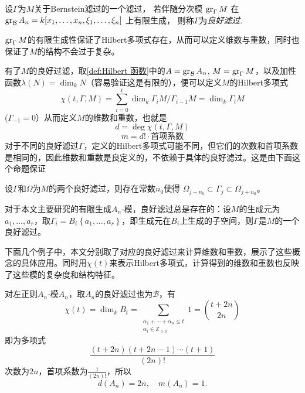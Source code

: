 \documentclass[12pt,a4paper]{ctexrep}   %
\begin{document}
\begin{definition}
    设$\Gamma$为$M$关于Bernstein滤过的一个滤过，
    若伴随分次模 $\operatorname{gr}_\Gamma M$
    在 $\operatorname{gr}_{\mathcal{B}}A_n=k[x_1,\dots,x_n,\xi_1,\dots,\xi_n]$ 上有限生成，
    则称$\Gamma$为\emph{良好滤过}.
\end{definition}
$\operatorname{gr}_{\Gamma}M$的有限生成性保证了Hilbert多项式存在，从而可以定义维数与重数，同时也保证了$M$的结构不会过于复杂。

有了$M$的良好过滤，取\ref{def:Hilbert 函数}中的$A=\operatorname{gr}_{\mathcal{B}}A_n$, $M=\operatorname{gr}_\Gamma M$，以及加性函数$\lambda(N)=\dim_k N$（容易验证这是有限的），便可以定义$M$的Hilbert多项式
\begin{equation*}
    \chi(t,\Gamma,M)=\sum_{i=0}^t \dim_k \Gamma_i M/\Gamma_{i-1} M
    =
    \dim_k \Gamma_t M
\end{equation*}
($\Gamma_{-1}=0$）从而定义$M$的维数和重数，也就是
\begin{equation*}
    d=\deg \chi(t,\Gamma,M)
\end{equation*}
\begin{equation*}
    m=d!\cdot \text{首项系数}
\end{equation*}
对于不同的良好滤过$\Gamma$，定义的Hilbert多项式可能不同，但它们的次数和首项系数是相同的，因此维数和重数是良定义的，不依赖于具体的良好滤过。这是由下面这个命题保证
\begin{proposition}
    设$\Gamma$和$\Omega$为$M$的两个良好滤过，则存在常数$n_0$使得
    $\Omega_{j-n_0}\subset\Gamma_j\subset \Omega_{j+n_0}$。
\end{proposition}
对于本文主要研究的有限生成$A_n$-模，良好滤过总是存在的：设$M$的生成元为$a_1,\dots,a_r$，取$\Gamma_i=B_i\left\{a_1,\ldots,a_r\right\}$，即生成元在$B_i$上生成的子空间，则$\Gamma$是$M$的一个良好滤过。


下面几个例子中，本文分别取了对应的良好滤过来计算维数和重数，展示了这些概念的具体应用。同时用$\chi(t)$来表示Hilbert多项式，计算得到的维数和重数也反映了这些模的复杂度和结构特征。
\begin{example}
    对左正则$A_n$-模$A_n$，取$A_n$的良好滤过也为$\mathcal{B}$，有
    \begin{equation*}
        \chi(t) =\dim_k B_t
        =
        \sum_{\substack{\alpha_1+\cdots+\alpha_n\leq t \\ \alpha_i \in \mathbb{Z}_{\geq 0}}} 1
        =
        \binom{t+2n}{2n}
    \end{equation*}
    即为多项式
    \begin{equation*}
        \frac{(t+2n)(t+2n-1)\cdots(t+1)}{(2n)!}
    \end{equation*}
    次数为$2n$，首项系数为$\frac{1}{(2n)!}$，所以
    \begin{equation*}
        d(A_n)=2n,
        \quad
        m(A_n)=1.
    \end{equation*}
\end{example}
\end{document}
